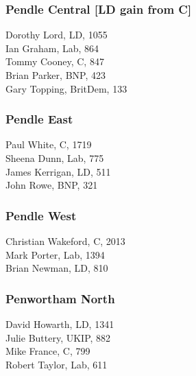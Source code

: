 \documentclass[a4paper,openany,10pt]{book}
\begin{document}
\subsubsection*{Pendle Central \hspace*{\fill}\nolinebreak[1]%
\enspace\hspace*{\fill}
[LD gain from C]}



Dorothy Lord, LD, 1055\\
Ian Graham, Lab, 864\\
Tommy Cooney, C, 847\\
Brian Parker, BNP, 423\\
Gary Topping, BritDem, 133\\


\subsubsection*{Pendle East}



Paul White, C, 1719\\
Sheena Dunn, Lab, 775\\
James Kerrigan, LD, 511\\
John Rowe, BNP, 321\\


\subsubsection*{Pendle West}



Christian Wakeford, C, 2013\\
Mark Porter, Lab, 1394\\
Brian Newman, LD, 810\\


\subsubsection*{Penwortham North}



David Howarth, LD, 1341\\
Julie Buttery, UKIP, 882\\
Mike France, C, 799\\
Robert Taylor, Lab, 611\\
\end{document}
